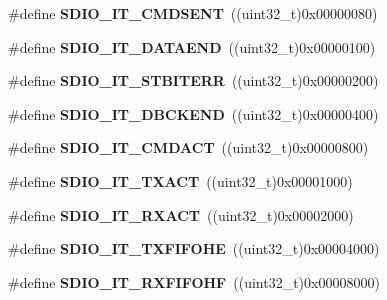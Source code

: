 \begin{DoxyCompactItemize}
\item 
\hypertarget{group__SDIO__Interrupt__sources_gaf9d8fc4651c4b7555fb9ee4e5af6ca63}{
\#define {\bfseries SDIO\_\-IT\_\-CMDSENT}~((uint32\_\-t)0x00000080)}
\label{group__SDIO__Interrupt__sources_gaf9d8fc4651c4b7555fb9ee4e5af6ca63}

\item 
\hypertarget{group__SDIO__Interrupt__sources_ga6cc1c521b64fc57b844336f7f175dd1e}{
\#define {\bfseries SDIO\_\-IT\_\-DATAEND}~((uint32\_\-t)0x00000100)}
\label{group__SDIO__Interrupt__sources_ga6cc1c521b64fc57b844336f7f175dd1e}

\item 
\hypertarget{group__SDIO__Interrupt__sources_ga55f7e65ed1b70d5a6abdc3cc41b55766}{
\#define {\bfseries SDIO\_\-IT\_\-STBITERR}~((uint32\_\-t)0x00000200)}
\label{group__SDIO__Interrupt__sources_ga55f7e65ed1b70d5a6abdc3cc41b55766}

\item 
\hypertarget{group__SDIO__Interrupt__sources_gaa1b1fb453a3ce3b10928aaeada2b2186}{
\#define {\bfseries SDIO\_\-IT\_\-DBCKEND}~((uint32\_\-t)0x00000400)}
\label{group__SDIO__Interrupt__sources_gaa1b1fb453a3ce3b10928aaeada2b2186}

\item 
\hypertarget{group__SDIO__Interrupt__sources_gae73ae9bc72eaeedc2a37221697bc33e2}{
\#define {\bfseries SDIO\_\-IT\_\-CMDACT}~((uint32\_\-t)0x00000800)}
\label{group__SDIO__Interrupt__sources_gae73ae9bc72eaeedc2a37221697bc33e2}

\item 
\hypertarget{group__SDIO__Interrupt__sources_ga811e683588ab887abb0101defafdb51e}{
\#define {\bfseries SDIO\_\-IT\_\-TXACT}~((uint32\_\-t)0x00001000)}
\label{group__SDIO__Interrupt__sources_ga811e683588ab887abb0101defafdb51e}

\item 
\hypertarget{group__SDIO__Interrupt__sources_ga1d9a59a2415b57bdf9827423cb6ce3a0}{
\#define {\bfseries SDIO\_\-IT\_\-RXACT}~((uint32\_\-t)0x00002000)}
\label{group__SDIO__Interrupt__sources_ga1d9a59a2415b57bdf9827423cb6ce3a0}

\item 
\hypertarget{group__SDIO__Interrupt__sources_gaf538ae7dd73d55e76069e8710858038a}{
\#define {\bfseries SDIO\_\-IT\_\-TXFIFOHE}~((uint32\_\-t)0x00004000)}
\label{group__SDIO__Interrupt__sources_gaf538ae7dd73d55e76069e8710858038a}

\item 
\hypertarget{group__SDIO__Interrupt__sources_gadcbc1a0de8b9df83b5c6c839b4739c87}{
\#define {\bfseries SDIO\_\-IT\_\-RXFIFOHF}~((uint32\_\-t)0x00008000)}
\label{group__SDIO__Interrupt__sources_gadcbc1a0de8b9df83b5c6c839b4739c87}


\end{DoxyCompactItemize}
